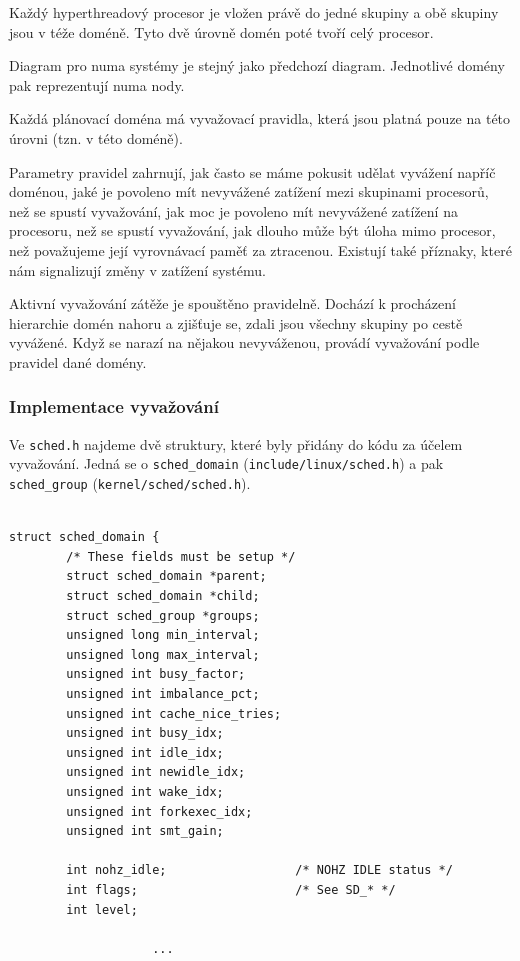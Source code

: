 \documentclass[a4paper,12pt]{article}
\begin{document}
Každý hyperthreadový procesor je vložen právě do jedné skupiny a obě skupiny jsou v téže doméně. Tyto dvě úrovně domén poté tvoří celý procesor. 

Diagram pro numa systémy je stejný jako předchozí diagram. Jednotlivé domény pak reprezentují numa nody. 


Každá plánovací doména má vyvažovací pravidla, která jsou platná pouze na této úrovni (tzn. v této doméně). 

Parametry pravidel zahrnují, jak často se máme pokusit udělat vyvážení napříč doménou, jaké je povoleno mít nevyvážené zatížení mezi skupinami procesorů, než se spustí vyvažování, jak moc je povoleno mít nevyvážené zatížení na procesoru, než se spustí vyvažování, jak dlouho může být úloha mimo procesor, než považujeme její vyrovnávací paměť za ztracenou.
Existují také příznaky, které nám signalizují změny v zatížení systému. 

Aktivní vyvažování zátěže je spouštěno pravidelně. Dochází k procházení hierarchie domén nahoru a zjišťuje se, zdali jsou všechny skupiny po cestě vyvážené. Když se narazí na nějakou nevyváženou, provádí vyvažování podle pravidel dané domény.

\newpage
\subsubsection{Implementace vyvažování}

Ve \verb#sched.h# najdeme dvě struktury, které byly přidány do kódu za účelem vyvažování. Jedná se o \verb#sched_domain# (\verb#include/linux/sched.h#) a pak \verb#sched_group# (\verb#kernel/sched/sched.h#).

\begin{verbatim} 

struct sched_domain {
        /* These fields must be setup */
        struct sched_domain *parent;
        struct sched_domain *child;
        struct sched_group *groups;
        unsigned long min_interval;
        unsigned long max_interval;
        unsigned int busy_factor;
        unsigned int imbalance_pct;
        unsigned int cache_nice_tries;
        unsigned int busy_idx;
        unsigned int idle_idx;
        unsigned int newidle_idx;
        unsigned int wake_idx;
        unsigned int forkexec_idx;
        unsigned int smt_gain;

        int nohz_idle;                  /* NOHZ IDLE status */
        int flags;                      /* See SD_* */
        int level;

                	...

\end{verbatim} 
\end{document}
